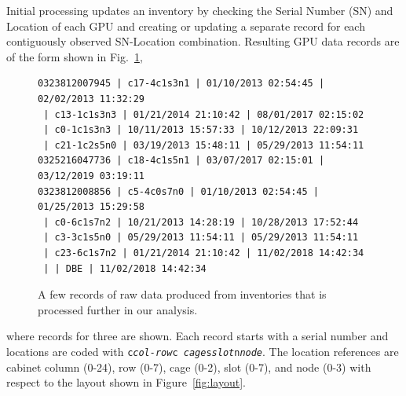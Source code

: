 Initial processing updates an inventory by checking the Serial Number
(SN) and Location of each GPU and creating or updating a separate
record for each contiguously observed SN-Location
combination. Resulting GPU data records are of the form shown in
Fig.~\ref{fig:dataraw},
\begin{figure}[tb]
{\notsotiny
\begin{verbatim}
0323812007945 | c17-4c1s3n1 | 01/10/2013 02:54:45 | 02/02/2013 11:32:29
 | c13-1c1s3n3 | 01/21/2014 21:10:42 | 08/01/2017 02:15:02
 | c0-1c1s3n3 | 10/11/2013 15:57:33 | 10/12/2013 22:09:31
 | c21-1c2s5n0 | 03/19/2013 15:48:11 | 05/29/2013 11:54:11
0325216047736 | c18-4c1s5n1 | 03/07/2017 02:15:01 | 03/12/2019 03:19:11
0323812008856 | c5-4c0s7n0 | 01/10/2013 02:54:45 | 01/25/2013 15:29:58
 | c0-6c1s7n2 | 10/21/2013 14:28:19 | 10/28/2013 17:52:44
 | c3-3c1s5n0 | 05/29/2013 11:54:11 | 05/29/2013 11:54:11
 | c23-6c1s7n2 | 01/21/2014 21:10:42 | 11/02/2018 14:42:34
 | | DBE | 11/02/2018 14:42:34
\end{verbatim}
}
\caption{A few records of raw data produced from inventories that is
  processed further in our analysis.}
\label{fig:dataraw}
\end{figure}
where records for three are shown. Each record starts with a serial
number and locations are coded with {\tt c{\it col-row}c{\it
    cage}s{\it slot}n{\it node}}. The location references are cabinet
column (0-24), row (0-7), cage (0-2), slot (0-7), and node (0-3) with
respect to the layout shown in Figure~\ref{fig:layout}. 
